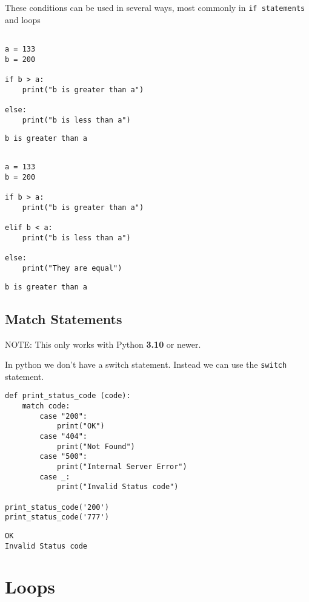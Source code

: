 \documentclass[11pt]{article}
\begin{document}
These conditions can be used in several ways, most commonly in \texttt{if statements} and loops

\begin{verbatim}

a = 133
b = 200

if b > a:
    print("b is greater than a")

else:
    print("b is less than a")
\end{verbatim}

\begin{verbatim}
b is greater than a
\end{verbatim}




\begin{verbatim}

a = 133
b = 200

if b > a:
    print("b is greater than a")

elif b < a:
    print("b is less than a")

else:
    print("They are equal")

\end{verbatim}

\begin{verbatim}
b is greater than a
\end{verbatim}

\subsection{Match Statements}
\label{sec:orgc2010d5}
NOTE: This only works with Python \textbf{3.10} or newer.

In python we don't have a switch statement. Instead we can use the \texttt{switch} statement.

\begin{verbatim}
def print_status_code (code):
    match code:
        case "200":
            print("OK")
        case "404":
            print("Not Found")
        case "500":
            print("Internal Server Error")
        case _:
            print("Invalid Status code")

print_status_code('200')
print_status_code('777')
\end{verbatim}

\begin{verbatim}
OK
Invalid Status code
\end{verbatim}

\section{Loops}
\label{sec:org89515bc}
\end{document}
